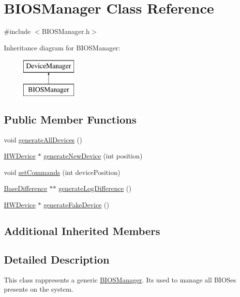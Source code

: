 \hypertarget{classBIOSManager}{}\section{B\+I\+O\+S\+Manager Class Reference}
\label{classBIOSManager}


{\ttfamily \#include $<$B\+I\+O\+S\+Manager.\+h$>$}

Inheritance diagram for B\+I\+O\+S\+Manager\+:\begin{figure}[H]
\begin{center}
\leavevmode
\includegraphics[height=2.000000cm]{classBIOSManager}
\end{center}
\end{figure}
\subsection*{Public Member Functions}
\begin{DoxyCompactItemize}
\item 
void \hyperlink{classBIOSManager_a51496e7da497767975a30fa0aeb53465}{generate\+All\+Devices} ()
\item 
\hyperlink{classHWDevice}{H\+W\+Device} $\ast$ \hyperlink{classBIOSManager_a18f5940451895ec20a049da0b7c01d7d}{generate\+New\+Device} (int position)
\item 
void \hyperlink{classBIOSManager_aaa51bf1d61f4609484a9903fe5a6340e}{set\+Commands} (int device\+Position)
\item 
\hyperlink{classBaseDifference}{Base\+Difference} $\ast$$\ast$ \hyperlink{classBIOSManager_adac6d8eaa4f657834592928b28f29b65}{generate\+Log\+Difference} ()
\item 
\hyperlink{classHWDevice}{H\+W\+Device} $\ast$ \hyperlink{classBIOSManager_ae75fe3a8dad20db9dfa5c3e9ddb2adfd}{generate\+Fake\+Device} ()
\end{DoxyCompactItemize}
\subsection*{Additional Inherited Members}


\subsection{Detailed Description}
This class rappresents a generic \hyperlink{classBIOSManager}{B\+I\+O\+S\+Manager}. It\textquotesingle{}s used to manage all B\+I\+O\+Ses presents on the system. 

